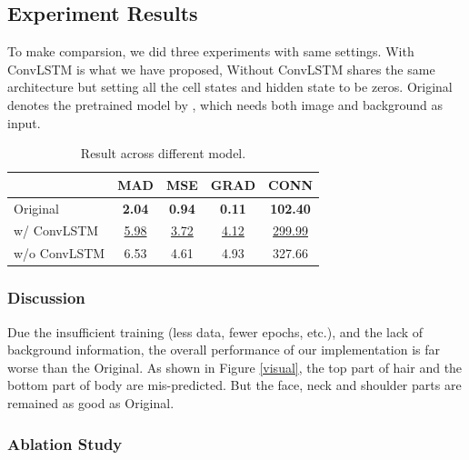 \documentclass[final]{cvpr}
\begin{document}
\subsection{Experiment Results}

To make comparsion, we did three experiments with same settings.
With ConvLSTM is what we have proposed, Without ConvLSTM shares the same architecture but setting all the cell states and hidden state to be zeros. Original denotes the pretrained model by \cite{linRealTimeHighResolutionBackground2020a}, which needs both image and background as input.

\begin{table}[h]
    \centering
    \caption{Result across different model.}
    \label{result}
    \begin{tabular}{lcccc}
        \toprule
        {}           & MAD              & MSE              & GRAD             & CONN               \\
        \midrule
        Original     & \textbf{2.04}    & \textbf{0.94}    & \textbf{0.11}    & \textbf{102.40}    \\
        \midrule
        w/ ConvLSTM  & \underline{5.98} & \underline{3.72} & \underline{4.12} & \underline{299.99} \\
        w/o ConvLSTM & 6.53             & 4.61             & 4.93             & 327.66             \\
        \bottomrule
    \end{tabular}
\end{table}

\subsubsection{Discussion}

Due the insufficient training (less data, fewer epochs, etc.), and the lack of background information, the overall performance of our implementation is far worse than the Original.
As shown in Figure \ref{visual}, the top part of hair and the bottom part of body are mis-predicted.
But the face, neck and shoulder parts are remained as good as Original.

\subsubsection{Ablation Study}
\end{document}
